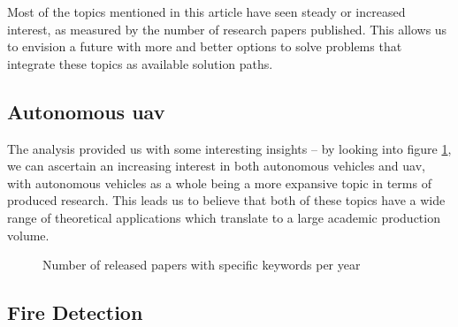 \documentclass[runningheads]{llncs}
\begin{document}
Most of the topics mentioned in this article have seen steady or increased interest, as measured by the number of research papers published. This allows us to envision a future with more and better options to solve problems that integrate these topics as available solution paths.

\subsection{Autonomous \acrshort{uav}}

The analysis provided us with some interesting insights – by looking into figure \ref{fig:auav}, we can ascertain an increasing interest in both autonomous vehicles and \acrshort{uav}, with autonomous vehicles as a whole being a more expansive topic in terms of produced research. This leads us to believe that both of these topics have a wide range of theoretical applications which translate to a large academic production volume. 

\begin{figure}[htb]
\caption{Number of released papers with specific keywords per year}
\label{fig:auav}
\end{figure}

\subsection{Fire Detection}
\end{document}
